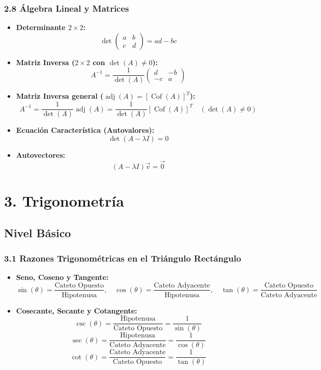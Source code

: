 \documentclass[11pt,a4paper]{article}
\begin{document}
\subsubsection*{2.8 Álgebra Lineal y Matrices}

\begin{itemize}
  \item \textbf{Determinante $2 \times 2$:}
  \[
    \det \begin{pmatrix} a & b \\ c & d \end{pmatrix} = ad - bc
  \]
  \item \textbf{Matriz Inversa ($2 \times 2$ con $\det(A) \ne 0$):}
  \[
    A^{-1} = \frac{1}{\det(A)} \begin{pmatrix} d & -b \\ -c & a \end{pmatrix}
  \]
  \item \textbf{Matriz Inversa general ($\operatorname{adj}(A) = [\operatorname{Cof}(A)]^T$):}
  \[
    A^{-1} = \frac{1}{\det(A)} \operatorname{adj}(A) = \frac{1}{\det(A)} [\operatorname{Cof}(A)]^T \quad (\det(A) \ne 0)
  \]
  \item \textbf{Ecuación Característica (Autovalores):}
  \[
    \det(A - \lambda I) = 0
  \]
  \item \textbf{Autovectores:}
  \[
    (A - \lambda I)\vec{v} = \vec{0}
  \]
\end{itemize}

\section*{3. Trigonometría}

\subsection*{Nivel Básico}

\subsubsection*{3.1 Razones Trigonométricas en el Triángulo Rectángulo}

\begin{itemize}
  \item \textbf{Seno, Coseno y Tangente:}
  \[
    \sin(\theta) = \frac{\text{Cateto Opuesto}}{\text{Hipotenusa}}, \quad \cos(\theta) = \frac{\text{Cateto Adyacente}}{\text{Hipotenusa}}, \quad \tan(\theta) = \frac{\text{Cateto Opuesto}}{\text{Cateto Adyacente}}
  \]
  \item \textbf{Cosecante, Secante y Cotangente:}
  \[
    \csc(\theta) = \frac{\text{Hipotenusa}}{\text{Cateto Opuesto}} = \frac{1}{\sin(\theta)}
  \]
  \[
    \sec(\theta) = \frac{\text{Hipotenusa}}{\text{Cateto Adyacente}} = \frac{1}{\cos(\theta)}
  \]
  \[
    \cot(\theta) = \frac{\text{Cateto Adyacente}}{\text{Cateto Opuesto}} = \frac{1}{\tan(\theta)}
  \]
\end{itemize}
\end{document}
